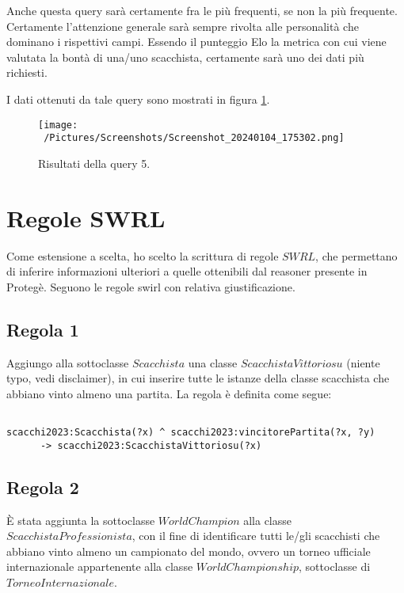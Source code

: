 \documentclass[12pt]{book}
\begin{document}
Anche questa query sarà certamente fra le più frequenti, se non la più
frequente. Certamente l'attenzione generale sarà sempre rivolta alle
personalità che dominano i rispettivi campi. Essendo il punteggio Elo
la metrica con cui viene valutata la bontà di una/uno scacchista,
certamente sarà uno dei dati più richiesti.

I dati ottenuti da tale query sono mostrati in figura \ref{fig:query5}.

\begin{figure}[h]
  \caption{Risultati della query 5.}
  \centering
  \label{fig:query5}
  \texttt{[image: ~/Pictures/Screenshots/Screenshot\_20240104\_175302.png]}
\end{figure} 


\chapter{Regole SWRL}

Come estensione a scelta, ho scelto la scrittura di regole $SWRL$, che
permettano di inferire informazioni ulteriori a quelle ottenibili dal
reasoner presente in Protegè.
Seguono le regole swirl con relativa giustificazione.

\section{Regola 1}

Aggiungo alla sottoclasse $Scacchista$ una classe
$ScacchistaVittoriosu$ (niente typo, vedi disclaimer), in cui inserire tutte le istanze della classe
scacchista che abbiano vinto almeno una partita.
La regola è definita come segue:
\begin{verbatim}

scacchi2023:Scacchista(?x) ^ scacchi2023:vincitorePartita(?x, ?y) 
      -> scacchi2023:ScacchistaVittoriosu(?x)

\end{verbatim}

\section{Regola 2}

È stata aggiunta la sottoclasse $WorldChampion$ alla classe
$ScacchistaProfessionista$, con il fine di identificare tutti le/gli
scacchisti che abbiano vinto almeno un campionato del mondo, ovvero
un torneo ufficiale internazionale appartenente alla classe
$WorldChampionship$, sottoclasse di $TorneoInternazionale$.
\end{document}
